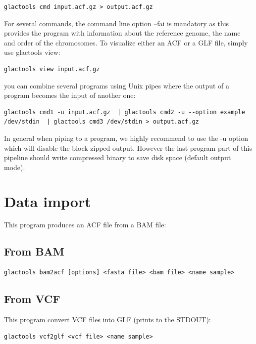 \documentclass[a4paper]{article}
\begin{document}
\begin{lstlisting}
glactools cmd input.acf.gz > output.acf.gz 
\end{lstlisting}

\noindent  For several commands, the command line option --fai is mandatory as this provides the program with information about the reference genome, the name  and order of the chromosomes. To visualize either an ACF or a GLF file,  simply use glactools view:


\begin{lstlisting}
glactools view input.acf.gz 
\end{lstlisting}

\noindent you can combine several programs using Unix pipes where the output of a program becomes the input of another one:

\begin{lstlisting}
glactools cmd1 -u input.acf.gz  | glactools cmd2 -u --option example /dev/stdin  | glactools cmd3 /dev/stdin > output.acf.gz
\end{lstlisting}

\noindent In general when piping to a program, we highly recommend to use the -u option which will disable the block zipped output.  However the last program part of this pipeline should write compressed binary to save disk space (default output mode). 

\newpage
\section{Data import}

\noindent This program produces an ACF file from a BAM file:

\subsection{From BAM}

\small
\begin{lstlisting} 
glactools bam2acf [options] <fasta file> <bam file> <name sample> 
\end{lstlisting} 
\normalsize


\subsection{From VCF}

\noindent This program convert VCF files into GLF (prints to the STDOUT):

\begin{lstlisting}
glactools vcf2glf <vcf file> <name sample> 
\end{lstlisting}
\end{document}
